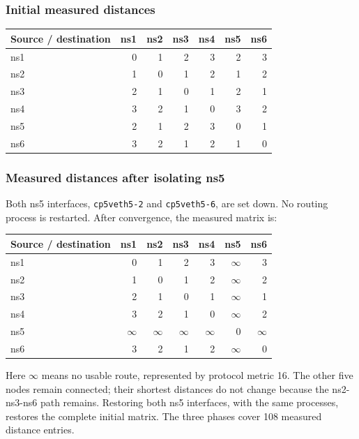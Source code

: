 \documentclass[
  a4paper,
  10pt]{article}
\newcounter{none} %
\begin{document}
\subsubsection{Initial measured
distances}\label{initial-measured-distances}

{\def\LTcaptype{none} %
\begin{longtable}[]{@{}lrrrrrr@{}}
\toprule\noalign{}
Source / destination & ns1 & ns2 & ns3 & ns4 & ns5 & ns6 \\
\midrule\noalign{}
\endhead
\bottomrule\noalign{}
\endlastfoot
ns1 & 0 & 1 & 2 & 3 & 2 & 3 \\
ns2 & 1 & 0 & 1 & 2 & 1 & 2 \\
ns3 & 2 & 1 & 0 & 1 & 2 & 1 \\
ns4 & 3 & 2 & 1 & 0 & 3 & 2 \\
ns5 & 2 & 1 & 2 & 3 & 0 & 1 \\
ns6 & 3 & 2 & 1 & 2 & 1 & 0 \\
\end{longtable}
}

\subsubsection{Measured distances after isolating
ns5}\label{measured-distances-after-isolating-ns5}

Both ns5 interfaces, \texttt{cp5veth5-2} and \texttt{cp5veth5-6}, are
set down. No routing process is restarted. After convergence, the
measured matrix is:

{\def\LTcaptype{none} %
\begin{longtable}[]{@{}lrrrrrr@{}}
\toprule\noalign{}
Source / destination & ns1 & ns2 & ns3 & ns4 & ns5 & ns6 \\
\midrule\noalign{}
\endhead
\bottomrule\noalign{}
\endlastfoot
ns1 & 0 & 1 & 2 & 3 & \(\infty\) & 3 \\
ns2 & 1 & 0 & 1 & 2 & \(\infty\) & 2 \\
ns3 & 2 & 1 & 0 & 1 & \(\infty\) & 1 \\
ns4 & 3 & 2 & 1 & 0 & \(\infty\) & 2 \\
ns5 & \(\infty\) & \(\infty\) & \(\infty\) & \(\infty\) & 0 &
\(\infty\) \\
ns6 & 3 & 2 & 1 & 2 & \(\infty\) & 0 \\
\end{longtable}
}

Here \(\infty\) means no usable route, represented by protocol metric
16. The other five nodes remain connected; their shortest distances do
not change because the ns2-ns3-ns6 path remains. Restoring both ns5
interfaces, with the same processes, restores the complete initial
matrix. The three phases cover 108 measured distance entries.
\end{document}
